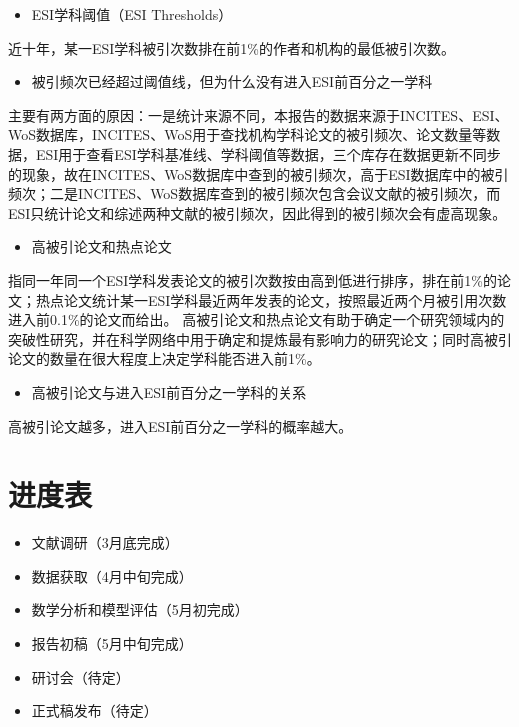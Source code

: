 \documentclass[cn, 11pt, fancy, hide]{elegantbook}
\providecommand{\tightlist}{%
  \setlength{\itemsep}{0pt}\setlength{\parskip}{0pt}}
\begin{document}
\begin{itemize}
\tightlist
\item
  ESI学科阈值（ESI Thresholds）
\end{itemize}

近十年，某一ESI学科被引次数排在前1\%的作者和机构的最低被引次数。

\begin{itemize}
\tightlist
\item
  被引频次已经超过阈值线，但为什么没有进入ESI前百分之一学科
\end{itemize}

主要有两方面的原因：一是统计来源不同，本报告的数据来源于INCITES、ESI、WoS数据库，INCITES、WoS用于查找机构学科论文的被引频次、论文数量等数据，ESI用于查看ESI学科基准线、学科阈值等数据，三个库存在数据更新不同步的现象，故在INCITES、WoS数据库中查到的被引频次，高于ESI数据库中的被引频次；二是INCITES、WoS数据库查到的被引频次包含会议文献的被引频次，而ESI只统计论文和综述两种文献的被引频次，因此得到的被引频次会有虚高现象。

\begin{itemize}
\tightlist
\item
  高被引论文和热点论文
\end{itemize}

指同一年同一个ESI学科发表论文的被引次数按由高到低进行排序，排在前1\%的论文；热点论文统计某一ESI学科最近两年发表的论文，按照最近两个月被引用次数进入前0.1\%的论文而给出。
高被引论文和热点论文有助于确定一个研究领域内的突破性研究，并在科学网络中用于确定和提炼最有影响力的研究论文；同时高被引论文的数量在很大程度上决定学科能否进入前1\%。

\begin{itemize}
\tightlist
\item
  高被引论文与进入ESI前百分之一学科的关系
\end{itemize}

高被引论文越多，进入ESI前百分之一学科的概率越大。

\hypertarget{ux8fdbux5ea6ux8868}{%
\section*{进度表}\label{ux8fdbux5ea6ux8868}}

\begin{itemize}
\tightlist
\item
  文献调研（3月底完成）
\item
  数据获取（4月中旬完成）
\item
  数学分析和模型评估（5月初完成）
\item
  报告初稿（5月中旬完成）
\item
  研讨会（待定）
\item
  正式稿发布（待定）
\end{itemize}
\end{document}
